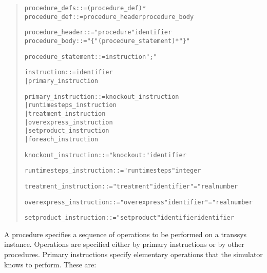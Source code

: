 \documentclass[a4paper,fleqn]{article}
\newenvironment{ebnfrule}{\begin{footnotesize}\begin{quote}\begin{alltt}}{\end{alltt}\end{quote}\end{footnotesize}}
\begin{document}
\begin{ebnfrule}
procedure_defs ::= (procedure_def)*
procedure_def ::= procedure_header procedure_body

procedure_header ::= "procedure" identifier
procedure_body ::= "\{" (procedure_statement)* "\}"

procedure_statement ::= instruction ";"

instruction ::= identifier
        | primary_instruction

primary_instruction ::= knockout_instruction
        | runtimesteps_instruction
        | treatment_instruction
        | overexpress_instruction
        | setproduct_instruction
        | foreach_instruction

knockout_instruction ::= "knockout:" identifier 

runtimesteps_instruction ::= "runtimesteps" integer 

treatment_instruction ::= "treatment" identifier "=" realnumber 

overexpress_instruction ::= "overexpress" identifier "=" realnumber 

setproduct_instruction ::= "setproduct" identifier identifier 

\end{ebnfrule}
A procedure specifies a sequence of operations to be performed on a
transsys instance. Operations are specified either by primary
instructions or by other procedures. Primary instructions specify
elementary operations that the simulator knows to perform. These are:
\end{document}
